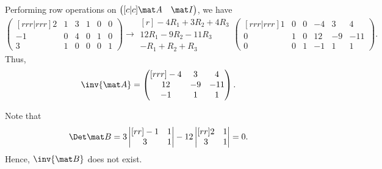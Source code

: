\begin{solution}
    Performing row operations on $\begin{pmatrix}[c|c]\mat A & \mat I\end{pmatrix}$, we have \[\begin{pmatrix}[rrr|rrr]2 & 1 & 3 & 1 & 0 & 0 \\ -1 & 0 & 4 & 0 & 1 & 0\\ 3 & 1 & 0 & 0 & 0 & 1\end{pmatrix} \rightarrow \begin{matrix}[r]\scriptstyle -4 R_1 + 3R_2 + 4R_3 \\ \scriptstyle 12R_1 -9 R_2 - 11R_3 \\ \scriptstyle -R_1 + R_2 + R_3 \end{matrix}\begin{pmatrix}[rrr|rrr]1 & 0 & 0 & -4 & 3 & 4 \\ 0 & 1 & 0 & 12 & -9 & -11 \\ 0 & 0 & 1 & -1 & 1 & 1\end{pmatrix}.\] Thus, \[\inv{\mat A} = \begin{pmatrix}[rrr]-4 & 3 & 4 \\ 12 & -9 & -11 \\ -1 & 1 & 1\end{pmatrix}.\]

    Note that \[\Det \mat B = 3\begin{vmatrix}[rr]-1 & 1 \\ 3 & 1\end{vmatrix} - 12 \begin{vmatrix}[rr]2 & 1 \\ 3 & 1\end{vmatrix} = 0.\] Hence, $\inv{\mat B}$ does not exist.


\end{solution}

